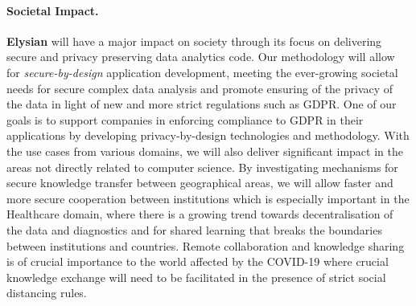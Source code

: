 \documentclass[a4paper,11pt]{article}
\newcommand{\project}[1]{\textbf{#1}\xspace}
\newcommand{\SECURITY}{\project{Elysian}}
\newcommand{\TheProject}{\SECURITY}
\begin{document}
\paragraph*{Societal Impact.}
\noindent
\TheProject{} will have a major impact on society through its focus on delivering secure and privacy preserving data analytics code. Our methodology will allow for \emph{secure-by-design} application development, meeting the ever-growing societal needs for secure complex data analysis and promote ensuring of the privacy of the data in light of new and more strict regulations such as GDPR. One of our goals is to support companies in enforcing compliance to GDPR in their applications by developing privacy-by-design technologies and methodology. With the use cases from various domains, we will also deliver significant impact in the areas not directly related to computer science. By investigating mechanisms for secure knowledge transfer between geographical areas, we will allow faster and more secure cooperation between institutions which is especially important in the Healthcare domain, where there is a growing trend towards decentralisation of the data and diagnostics and for shared learning that breaks the boundaries between institutions and countries. Remote collaboration and knowledge sharing is of crucial importance to the world affected by the COVID-19 where crucial knowledge exchange will need to be facilitated in the presence of strict social distancing rules.
\end{document}
